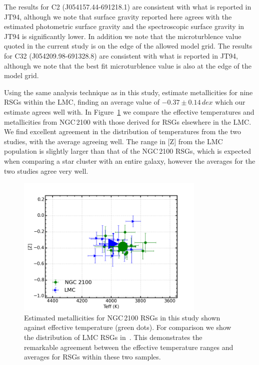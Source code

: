 \documentclass[useAMS,usenatbib]{mn2e}
\begin{document}

The results for C2 (J054157.44-691218.1) are consistent with what is reported in JT94, although we note that surface gravity reported here agrees with the estimated photometric surface gravity and the spectroscopic surface gravity in JT94 is significantly lower.
In addition we note that the microturblence value quoted in the current study is on the edge of the allowed model grid.
The results for C32 (J054209.98-691328.8) are consistent with what is reported in JT94, although we note that the best fit microturblence value is also at the edge of the model grid.


Using the same analysis technique as in this study,
\cite{2015ApJ...806...21D} estimate metallicities for nine RSGs within the LMC,
finding an average value of $-0.37\pm0.14\,dex$ which our estimate agrees well with.
In Figure~\ref{fig:TeffvsZ} we compare the effective temperatures and metallicities from NGC\,2100 with those derived for RSGs elsewhere in the LMC.
We find excellent agreement in the distribution of temperatures from the two studies, with the average agreeing well.
The range in [Z] from the LMC population is slightly larger than that of the NGC\,2100 RSGs, which is expected when comparing a star cluster with an entire galaxy, however the averages for the two studies agree very well.


\begin{figure}
 \includegraphics[width=9.0cm]{NGC2100-TeffvsZ-2100-LMC}
 \caption{Estimated metallicities for NGC\,2100 RSGs in this study shown against effective temperature (green dots).
        For comparison we show the distribution of LMC RSGs in~\citet[blue triangles][]{2015ApJ...806...21D}.
        This demonstrates the remarkable agreement between the effective temperature ranges and averages for RSGs within these two samples.
\label{fig:TeffvsZ}
          }
\end{figure}
\end{document}
